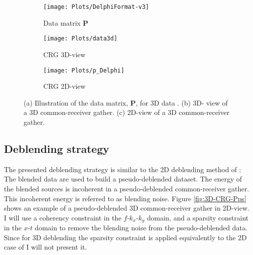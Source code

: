\documentclass{madrid15WS}
\begin{document}
\begin{figure}[h!]
	
	\centering
	\begin{subfigure}[t]{0.4\textwidth}
		\centering
		\texttt{[image: Plots/DelphiFormat-v3]}
		\caption{Data matrix $\mathbf{P}$}
		\label{fig:DelphiFormat}
	\end{subfigure}
	\qquad  
	\centering
	\begin{subfigure}[t]{0.3\textwidth}
		\centering
		\texttt{[image: Plots/data3d]}
		\caption{CRG 3D-view}
		\label{fig:CRG_3D-view}
	\end{subfigure}
	
	\centering
	\begin{subfigure}[t]{0.8\textwidth}
		\centering
		\texttt{[image: Plots/p\_Delphi]}
		\caption{CRG 2D-view}
		\label{fig:CRG_2D-view}
	\end{subfigure}
	
	\caption{(a) Illustration of the data matrix, $\mathbf{P}$, for 3D data \citep{Delphi-Format}. (b) 3D- view of a 3D common-receiver gather. (c) 2D-view of a 3D common-receiver gather.}
	\label{fig:DataSorting}
\end{figure}


\subsection{Deblending strategy}

The presented deblending strategy is similar to the 2D deblending method of \citet{Mahdad-Deblending-Method}: The blended data are used to build a pseudo-deblended dataset. The energy of the blended sources is incoherent in a pseudo-deblended common-receiver gather. This incoherent energy is referred to as blending noise. Figure \ref{fig:3D-CRG-Pps} shows an example of a pseudo-deblended 3D common-receiver gather in 2D-view. I will use a coherency constraint in the $f$-$k_x$-$k_y$ domain, and a sparsity constraint in the $x$-$t$ domain to remove the blending noise from the pseudo-deblended data. Since for 3D deblending the sparsity constraint is applied equivalently to the 2D case of \citet{Mahdad-Deblending-Method} I will not present it.
\end{document}
